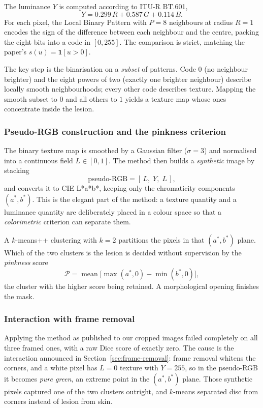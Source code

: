 \documentclass[11pt,a4paper]{article}
\begin{document}
The luminance $Y$ is computed according to ITU-R BT.601,
\[
Y = 0.299\,R + 0.587\,G + 0.114\,B .
\]
For each pixel, the Local Binary Pattern with $P = 8$ neighbours at radius
$R = 1$ encodes the sign of the difference between each neighbour and the
centre, packing the eight bits into a code in $[0, 255]$. The comparison is
strict, matching the paper's $s(u) = \mathbf{1}[u > 0]$.

The key step is the binarisation on a \emph{subset} of patterns. Code $0$ (no
neighbour brighter) and the eight powers of two (exactly one brighter neighbour)
describe locally smooth neighbourhoods; every other code describes texture.
Mapping the smooth subset to $0$ and all others to $1$ yields a texture map
whose ones concentrate inside the lesion.

\subsubsection{Pseudo-RGB construction and the pinkness criterion}

The binary texture map is smoothed by a Gaussian filter ($\sigma = 3$) and
normalised into a continuous field $L \in [0,1]$. The method then builds a
\emph{synthetic} image by stacking
\[
\text{pseudo-RGB} = [\,L,\; Y,\; L\,],
\]
and converts it to CIE L*a*b*, keeping only the chromaticity components
$(a^*, b^*)$. This is the elegant part of the method: a texture quantity and a
luminance quantity are deliberately placed in a colour space so that a
\emph{colorimetric} criterion can separate them.

A $k$-means++ clustering with $k = 2$ partitions the pixels in that $(a^*, b^*)$
plane. Which of the two clusters is the lesion is decided without supervision by
the \emph{pinkness} score
\[
\mathcal{P} = \operatorname{mean}\bigl[\max(a^*, 0) - \min(b^*, 0)\bigr],
\]
the cluster with the higher score being retained. A morphological opening
finishes the mask.

\subsubsection{Interaction with frame removal}
\label{sec:lbp-frame}

Applying the method as published to our cropped images failed completely on
all three framed ones, with a raw Dice score of exactly zero. The cause is the interaction
announced in Section~\ref{sec:frame-removal}: frame removal whitens the corners, and a white pixel
has $L = 0$ texture with $Y = 255$, so in the pseudo-RGB it becomes
\emph{pure green}, an extreme point in the $(a^*, b^*)$ plane. Those synthetic
pixels captured one of the two clusters outright, and $k$-means separated disc
from corners instead of lesion from skin.
\end{document}

